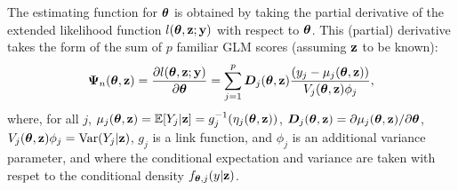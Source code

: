 \documentclass[twoside,11pt]{article}
\newcommand{\gb}[2][]{\todo[color=gbcolor, caption={GB}, #1]{#2}}
\newcommand{\E}{{\mathbb{E}}}
\begin{document}
The estimating function for ${\bm{\theta}}$ is obtained by taking the partial derivative of the extended likelihood function $l({\bm{\theta}}, {\bf z}; {\bf y})$ with respect to ${\bm{\theta}}$. This (partial) derivative takes the form of the sum of $p$ familiar GLM scores (assuming ${\bf z}$ to be known):
%
\begin{equation}
\bm\Psi_n({\bm{\theta}}, {\bf z}) = \frac{\partial l({\bm{\theta}}, {\bf z};{\bf y})}{\partial {\bm{\theta}}}=\sum_{j=1}^p \bm D_j({\bm{\theta}}, {\bf z})\frac{(y_{j} - \mu_j({\bm{\theta}}, {\bf z}))}{V_j({\bm{\theta}}, {\bf z})\phi_j},
    \label{eqn:generalized-linear-models}
\end{equation}
%
%
where, for all $j$, $\mu_j(\bt, \z) = \E[Y_{j}|\z] = g_j^{-1}(\eta_j(\bt, \z))$, $\bm D_j({\bm{\theta}}, {\bf z}) = \partial \mu_j({\bm{\theta}}, {\bf z})/\partial {\bm{\theta}}$, $V_j({\bm{\theta}}, {\bf z})\phi_j = \text{Var}(Y_{j}|{\bf z})$, $g_j$ is a link function, and $\phi_j$ is an additional variance parameter, and where the conditional expectation and variance are taken with respet to the conditional density $f_{{\bm{\theta}},j}(y|{\bf z})$.
\end{document}

